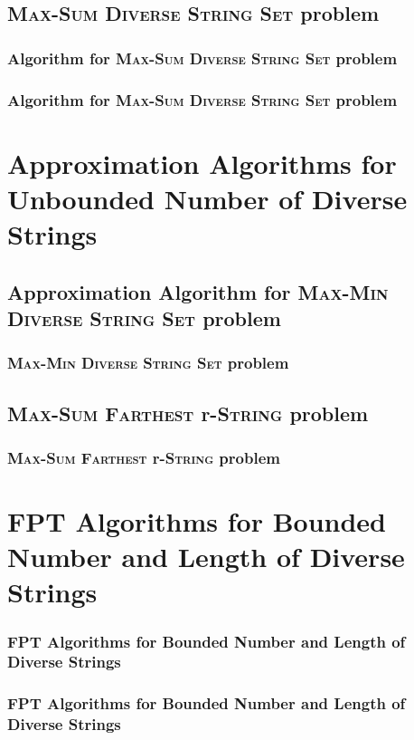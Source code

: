 \documentclass{beamer}
\begin{document}
\subsection{\textsc{Max-Sum Diverse String Set} problem}
\begin{frame}
    \frametitle{Algorithm for \textsc{Max-Sum Diverse String Set} problem}

\end{frame}

\begin{frame}
    \frametitle{Algorithm for \textsc{Max-Sum Diverse String Set} problem}

\end{frame}

\section{Approximation Algorithms for Unbounded Number of Diverse Strings}
\subsection{Approximation Algorithm for \textsc{Max-Min Diverse String Set} problem}
\begin{frame}
    \frametitle{\textsc{Max-Min Diverse String Set} problem}

\end{frame}

\subsection{\textsc{Max-Sum Farthest} r-\textsc{String} problem}
\begin{frame}
    \frametitle{\textsc{Max-Sum Farthest} r-\textsc{String} problem}
\end{frame}

\section{FPT Algorithms for Bounded Number and Length of Diverse Strings}
\begin{frame}
    \frametitle{FPT Algorithms for Bounded Number and Length of Diverse Strings}



\end{frame}

\begin{frame}
    \frametitle{FPT Algorithms for Bounded Number and Length of Diverse Strings}



\end{frame}
\end{document}
